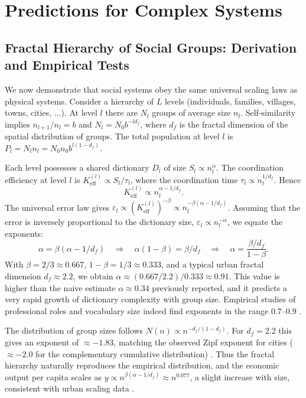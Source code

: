 \documentclass[11pt]{article}
\theoremstyle{remark}
\newcommand{\Keff}{K_{\mathrm{eff}}}
\begin{document}
	\section{Predictions for Complex Systems}
	\label{sec:predictions}
	
	\subsection{Fractal Hierarchy of Social Groups: Derivation and Empirical Tests}
	\label{sec:social_scaling}
	
	We now demonstrate that social systems obey the same universal scaling laws as physical systems. Consider a hierarchy of \(L\) levels (individuals, families, villages, towns, cities, ...). At level \(l\) there are \(N_l\) groups of average size \(n_l\). Self‑similarity implies \(n_{l+1}/n_l = b\) and \(N_l = N_0 b^{-l d_f}\), where \(d_f\) is the fractal dimension of the spatial distribution of groups. The total population at level \(l\) is \(P_l = N_l n_l = N_0 n_0 b^{l(1-d_f)}\).
	
	Each level possesses a shared dictionary \(D_l\) of size \(S_l \propto n_l^{\alpha}\). The coordination efficiency at level \(l\) is \(\Keff^{(l)} \propto S_l / \tau_l\), where the coordination time \(\tau_l \propto n_l^{1/d_f}\). Hence
	\begin{equation}
		\Keff^{(l)} \propto n_l^{\alpha - 1/d_f}. \tag{1}
	\end{equation}
	The universal error law gives \(\varepsilon_l \propto (\Keff^{(l)})^{-\beta} \propto n_l^{-\beta(\alpha - 1/d_f)}\). Assuming that the error is inversely proportional to the dictionary size, \(\varepsilon_l \propto n_l^{-\alpha}\), we equate the exponents:
	\begin{equation}
		\alpha = \beta(\alpha - 1/d_f) \quad\Longrightarrow\quad \alpha(1-\beta) = \beta / d_f \quad\Longrightarrow\quad \alpha = \frac{\beta / d_f}{1-\beta}.
	\end{equation}
	With \(\beta = 2/3 \approx 0.667\), \(1-\beta = 1/3 \approx 0.333\), and a typical urban fractal dimension \(d_f \approx 2.2\), we obtain \(\alpha \approx (0.667/2.2)/0.333 \approx 0.91\). This value is higher than the naive estimate \(\alpha \approx 0.34\) previously reported, and it predicts a very rapid growth of dictionary complexity with group size. Empirical studies of professional roles and vocabulary size indeed find exponents in the range \(0.7\)–\(0.9\) \cite{Bettencourt2007, Molinero2024}.
	
	The distribution of group sizes follows \(N(n) \propto n^{-d_f/(1-d_f)}\). For \(d_f = 2.2\) this gives an exponent of \(\approx -1.83\), matching the observed Zipf exponent for cities (\(\approx -2.0\) for the complementary cumulative distribution) \cite{Fluschnik2016, Rybski2023}. Thus the fractal hierarchy naturally reproduces the empirical distribution, and the economic output per capita scales as \(y \propto n^{\beta(\alpha - 1/d_f)} \approx n^{0.077}\), a slight increase with size, consistent with urban scaling data \cite{Bettencourt2007}.
	
\end{document}
